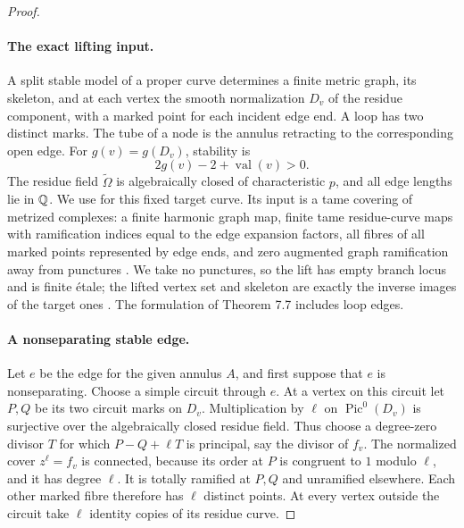 \begin{proof}
\paragraph{The exact lifting input.}
A split stable model of a proper curve determines a finite metric
graph, its skeleton, and at each vertex the smooth normalization
$D_v$ of the residue component, with a marked point for each
incident edge end. A loop has two distinct marks. The tube of a
node is the annulus retracting to the corresponding open edge.
For $g(v)=g(D_v)$, stability is
\[
                         2g(v)-2+\operatorname{val}(v)>0.
 \tag{D.16.2}
\]
The residue field $\widetilde\Omega$ is algebraically closed of
characteristic $p$, and all edge lengths lie in $\mathbb Q$.
We use \citet[Theorem 7.7]{D_ABBR2015} for this fixed target
curve. Its input is a tame covering of metrized complexes:
a finite harmonic graph map, finite tame residue-curve maps with
ramification indices equal to the edge expansion factors, all
fibres of all marked points represented by edge ends, and zero
augmented graph ramification away from punctures
\citep[Definitions 2.19 and 2.21]{D_ABBR2015}.
We take no punctures, so the lift has empty branch locus and is
finite \'etale; the lifted vertex set and skeleton are exactly the
inverse images of the target ones
\citep[Definitions 4.25 and 4.31]{D_ABBR2015}.
The formulation of Theorem 7.7 includes loop edges.

\paragraph{A nonseparating stable edge.}
Let $e$ be the edge for the given annulus $A$, and first suppose
that $e$ is nonseparating. Choose a simple circuit through $e$.
At a vertex on this circuit let $P,Q$ be its two circuit marks
on $D_v$. Multiplication by $\ell$ on $\operatorname{Pic}^0(D_v)$
is surjective over the algebraically closed residue field.
Thus choose a degree-zero divisor $T$ for which
$P-Q+\ell T$ is principal, say the divisor of $f_v$.
The normalized cover $z^\ell=f_v$ is connected, because its
order at $P$ is congruent to $1$ modulo $\ell$, and it has degree
$\ell$. It is totally ramified at $P,Q$ and unramified elsewhere.
Each other marked fibre therefore has $\ell$ distinct points.
At every vertex outside the circuit take $\ell$ identity copies
of its residue curve.


\end{proof}
